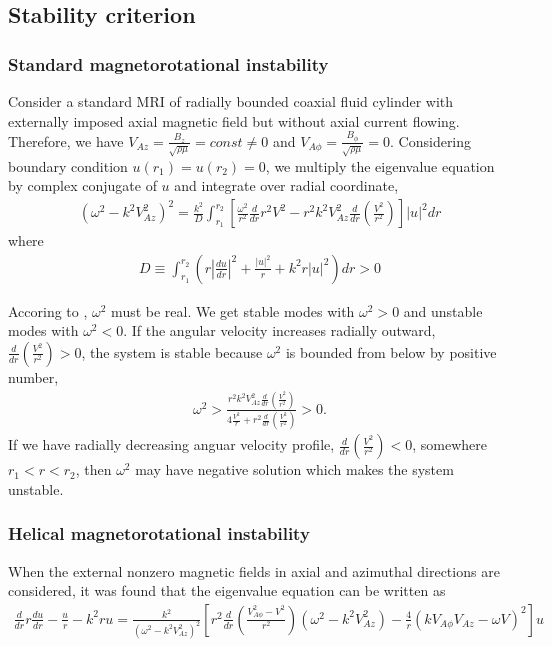 \documentclass{jfm}
\begin{document}
%
%
\subsection{Stability criterion}

\subsubsection{Standard magnetorotational instability}

Consider a standard MRI of radially bounded coaxial fluid cylinder with externally imposed axial magnetic field but without axial current flowing. Therefore, we have $V_{Az}=\frac{B_z}{\sqrt{\rho\mu}}=const \neq 0$ and $V_{A\phi}=\frac{B_\phi}{\sqrt{\rho\mu}}=0$. Considering boundary condition $u(r_1)=u(r_2)=0$, we multiply the eigenvalue equation by complex conjugate of $u$ and integrate over radial coordinate,
\begin{align}
    (\omega^2-k^2 V_{Az}^2)^2 = \frac{k^2}{D}\int_{r_1}^{r_2}\left[\frac{\omega^2}{r^2}\frac{d}{dr}r^2V^2 -r^2 k^2 V_{Az}^2 \frac{d}{dr}\left(\frac{V^2}{r^2}\right)\right]|u|^2 dr
\end{align}   
where 
\begin{align}
    D\equiv \int_{r_1}^{r_2}\left(r \left|\frac{du}{dr}\right|^2 +\frac{|u|^2}{r}+k^2 r |u|^2 \right) dr >0
\end{align}

Accoring to \cite{Chandrasekhar1960}, $\omega^2$ must be real. We get stable modes with $\omega^2>0$ and unstable modes with $\omega^2<0$. If the angular velocity increases radially outward, $\frac{d}{dr}\left(\frac{V^2}{r^2}\right)>0$, the system is stable because $\omega^2$ is bounded from below by positive number, 
\begin{align}
    \omega^2>\frac{r^2k^2 V_{Az}^2 \frac{d}{dr}\left(\frac{V^2}{r^2}\right)}{4\frac{V^2}{r}+r^2\frac{d}{dr}\left(\frac{V^2}{r^2}\right)}>0.
\end{align}
If we have radially decreasing anguar velocity profile, $\frac{d}{dr}\left(\frac{V^2}{r^2}\right)<0$, somewhere $r_1<r<r_2$, then $\omega^2$ may have negative solution which makes the system unstable.

\subsubsection{Helical magnetorotational instability}

When the external nonzero magnetic fields in axial and azimuthal directions are considered, it was found that the eigenvalue equation can be written as
\begin{align}
    \frac{d}{dr}r\frac{du}{dr}-\frac{u}{r}-k^2ru = \frac{k^2}{(\omega^2-k^2 V_{Az}^2)^2}\left[r^2 \frac{d}{dr}\left(\frac{V_{A\phi}^2-V^2}{r^2}\right)
    (\omega^2-k^2V_{Az}^2) 
    -\frac{4}{r}(kV_{A\phi}V_{Az}-\omega V)^2\right]u
\end{align}
\end{document}
